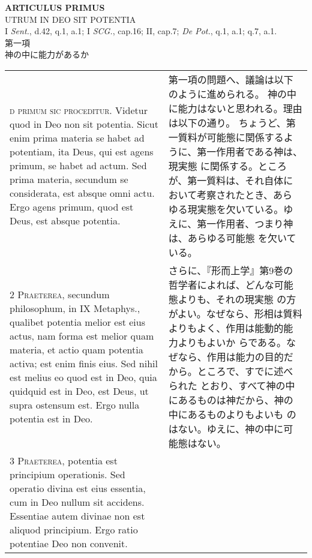 \documentclass[10pt]{jsarticle} %
\begin{document}
\begin{center}
 {\Large {\bf ARTICULUS PRIMUS}}\\
 {\large UTRUM IN DEO SIT POTENTIA}\\
 {\footnotesize I {\itshape Sent.}, d.42, q.1, a.1; I {\itshape
 SCG.}, cap.16; II, cap.7; {\itshape De Pot.}, q.1, a.1; q.7, a.1.}\\
 {\Large 第一項\\神の中に能力があるか}
\end{center}

\begin{longtable}{p{21em}p{21em}}


{\Huge}{\scshape d primum sic proceditur}. Videtur quod in
Deo non sit potentia. Sicut enim prima materia se habet ad potentiam,
ita Deus, qui est agens primum, se habet ad actum. Sed prima materia,
secundum se considerata, est absque omni actu. Ergo agens primum, quod
est Deus, est absque potentia.

&

第一項の問題へ、議論は以下のように進められる。
神の中に能力はないと思われる。理由は以下の通り。
ちょうど、第一質料が可能態に関係するように、第一作用者である神は、現実態
 に関係する。ところが、第一質料は、それ自体において考察されたとき、あら
 ゆる現実態を欠いている。ゆえに、第一作用者、つまり神は、あらゆる可能態
 を欠いている。


\\


{\scshape 2 Praeterea}, secundum philosophum, in IX
Metaphys., qualibet potentia melior est eius actus, nam forma est melior
quam materia, et actio quam potentia activa; est enim finis eius. Sed
nihil est melius eo quod est in Deo, quia quidquid est in Deo, est Deus,
ut supra ostensum est. Ergo nulla potentia est in Deo.

&

さらに、『形而上学』第9巻の哲学者によれば、どんな可能態よりも、それの現実態
の方がよい。なぜなら、形相は質料よりもよく、作用は能動的能力よりもよいか
 らである。なぜなら、作用は能力の目的だから。ところで、すでに述べられた
 とおり、すべて神の中にあるものは神だから、神の中にあるものよりもよいも
 のはない。ゆえに、神の中に可能態はない。

\\


{\scshape 3 Praeterea}, potentia est principium
operationis. Sed operatio divina est eius essentia, cum in Deo nullum
sit accidens. Essentiae autem divinae non est aliquod principium. Ergo
ratio potentiae Deo non convenit.


\end{longtable}
\end{document}
